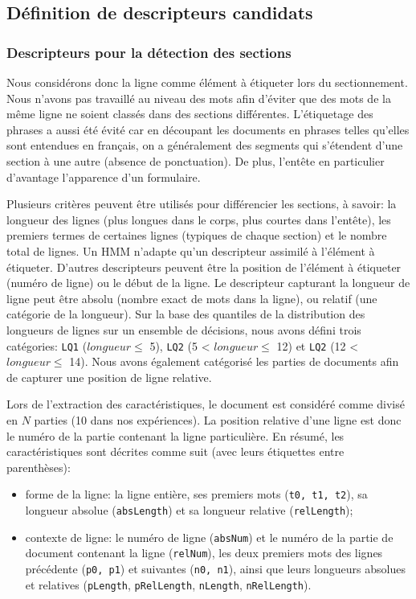 \subsection{Définition de descripteurs candidats}

\subsubsection{Descripteurs pour la détection des sections}

Nous considérons donc la ligne comme élément à étiqueter lors du sectionnement. Nous n'avons pas travaillé au niveau des mots afin d'éviter que des mots de la même ligne ne soient classés dans des sections différentes. L'étiquetage des phrases a aussi été évité car en découpant les documents en phrases telles qu'elles sont entendues en français, on a généralement des segments qui s'étendent d'une section à une autre (absence de ponctuation). De plus, l'entête en particulier d'avantage l'apparence d'un formulaire.

Plusieurs critères peuvent être utilisés pour différencier les sections, à savoir: la longueur des lignes (plus longues dans le corps, plus courtes dans l'entête), les premiers termes de certaines lignes (typiques de chaque section) et le nombre total de lignes. Un HMM n'adapte qu'un descripteur assimilé à l'élément à étiqueter. D'autres descripteurs peuvent être la position de l'élément à étiqueter (numéro de ligne) ou le début de la ligne. Le descripteur capturant la longueur de ligne peut être absolu (nombre exact de mots dans la ligne), ou relatif (une catégorie de la longueur). Sur la base des quantiles de la distribution des longueurs de lignes sur un ensemble de décisions, nous avons défini trois catégories:
\verb|LQ1| ($longueur \leq$ 5), \verb|LQ2| (5 < $longueur \leq$ 12) et \verb|LQ2| (12 < $longueur \leq$ 14). Nous avons également catégorisé les parties de documents afin de capturer une position de ligne relative.

Lors de l'extraction des caractéristiques, le document est considéré comme divisé en $N$ parties (10 dans nos expériences). La position relative d'une ligne est donc le numéro de la partie contenant la ligne particulière. En résumé, les caractéristiques sont décrites comme suit (avec leurs étiquettes entre parenthèses):
\begin{itemize}
 \item forme de la ligne: la ligne entière, ses premiers mots (\verb|t0, t1, t2|), sa longueur absolue (\verb|absLength|) et sa longueur relative (\verb|relLength|);
 \item contexte de ligne: le numéro de ligne (\verb|absNum|) et le numéro de la partie de document contenant la ligne (\verb|relNum|), les deux premiers mots des lignes précédente (\verb|p0, p1|) et suivantes (\verb|n0, n1|), ainsi que leurs longueurs absolues et relatives
 (\verb|pLength|, \verb|pRelLength|, \verb|nLength|, \verb|nRelLength|).
\end{itemize}

